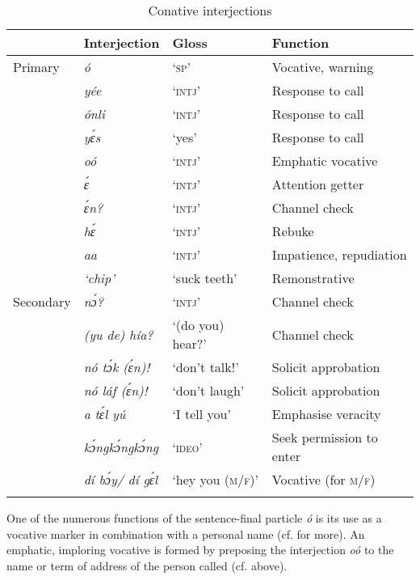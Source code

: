 \begin{table}
\caption{Conative interjections}
\label{tab:key:12.4}

\begin{tabularx}{\textwidth}{Xlll}
\lsptoprule
 & Interjection & Gloss & Function\\
 \midrule 
Primary & \itshape ó & ‘\textsc{sp}’ & Vocative, warning\\
& \itshape yée & ‘\textsc{intj}’ & Response to call\\
& \itshape ónli & ‘\textsc{intj}’ & Response to call\\
& \itshape yɛ́s & ‘yes’ & Response to call\\
& \itshape oó & ‘\textsc{intj}’ & Emphatic vocative\\
& \itshape ɛ́ & ‘\textsc{intj}’ & Attention getter\\
& \itshape ɛ́n? & ‘\textsc{intj}’ & Channel check\\
& \itshape hɛ́ & ‘\textsc{intj}’ & Rebuke\\
& \itshape aa & ‘\textsc{intj}’ & Impatience, repudiation\\
& \itshape ‘chip’ & ‘suck teeth’ & Remonstrative\\

\tablevspace
Secondary & \itshape nɔ́? & ‘\textsc{intj}’ & Channel check\\
& \itshape (yu de) hía? & ‘(do you) hear?’ & Channel check\\
& \itshape nó tɔ́k (ɛ́n)! & ‘don’t talk!’ & Solicit approbation\\
& \itshape nó láf (ɛ́n)! & ‘don’t laugh’ & Solicit approbation\\
& \itshape a tɛ́l yú & ‘I tell you’ & Emphasise veracity\\
& \itshape kɔ́ngkɔ́ngkɔ́ng & ‘\textsc{ideo}’ & Seek permission to enter\\
& \itshape dí bɔ́y/ dí gɛ́l & ‘hey you (\textsc{m/f)}’ & Vocative (for \textsc{m}/\textsc{f})\\
\lspbottomrule
\end{tabularx}
\end{table}
One of the numerous functions of the sentence-final particle \textit{ó} is its use as a vocative marker in combination with a personal name (cf.  for more). An emphatic, imploring vocative is formed by preposing the interjection \textit{oó} to the name or term of address of the person called (cf.  above). 



